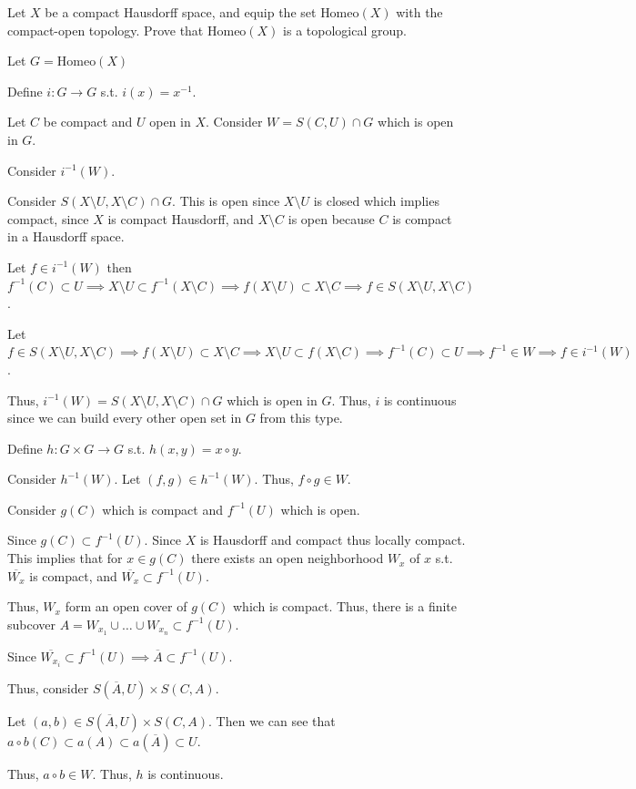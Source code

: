 \documentclass[12pt, letterpaper]{article}
\renewcommand{\t}[1]{\text{#1}}
\begin{document}
\begin{problem}{}
    Let $X$ be a compact Hausdorff space, and equip the set $\t{Homeo}(X)$
  with the compact-open topology. Prove that $\t{Homeo}(X)$ is a
  topological group.
\end{problem}
\begin{problemproof}
    Let $G=\t{Homeo}(X)$
    
    Define $i : G \to G$ s.t. $i(x)=x^{-1}$.

    Let $C$ be compact and $U$ open in $X$. Consider $W=S(C,U) \cap G$ which is open in $G$.

    Consider $i^{-1}(W)$. 

    Consider $S(X \setminus U, X \setminus C) \cap G$. This is open since $X \setminus U$ is closed which implies compact, since $X$ is compact Hausdorff, and $X \setminus C$ is open because $C$ is compact in a Hausdorff space.

    Let $f \in i^{-1}(W)$ then $f^{-1}(C) \subset U \implies X \setminus U \subset f^{-1}(X \setminus C) \implies f(X \setminus U) \subset X \setminus C \implies f \in S(X \setminus U, X \setminus C)$.

    Let $f \in S(X \setminus U, X \setminus C) \implies f(X \setminus U) \subset X \setminus C \implies X \setminus U \subset f(X \setminus C) \implies f^{-1}(C) \subset U \implies f^{-1} \in W \implies f \in i^{-1}(W)$.

    Thus, $i^{-1}(W)=S(X \setminus U, X \setminus C) \cap G$ which is open in $G$. Thus, $i$ is continuous since we can build every other open set in $G$ from this type.

    Define $h : G \times G \to G$ s.t. $h(x,y)=x \circ y$.

    Consider $h^{-1}(W)$. Let $(f,g) \in h^{-1}(W)$. Thus, $f \circ g \in W$.

    Consider $g(C)$ which is compact and $f^{-1}(U)$ which is open.

    Since $g(C) \subset f^{-1}(U)$. Since $X$ is Hausdorff and compact thus locally compact. This implies that for $x \in g(C)$ there exists an open neighborhood $W_x$ of $x$ s.t. $\overline{W_x}$ is compact, and $\overline{W_x} \subset f^{-1}(U)$.

    Thus, $W_x$ form an open cover of $g(C)$ which is compact. Thus, there is a finite subcover $A=W_{x_1} \cup \dots \cup W_{x_n} \subset f^{-1}(U)$.

    Since $\overline{W_{x_i}} \subset f^{-1}(U) \implies \overline{A} \subset f^{-1}(U)$.

    Thus, consider $S(\overline{A},U) \times S(C, A)$.

    Let $(a,b) \in S(\overline{A},U) \times S(C, A)$. Then we can see that $a \circ b(C) \subset a(A) \subset a(\overline{A}) \subset U$.

    Thus, $a\circ b \in W$. Thus, $h$ is continuous.
\end{problemproof}
\end{document}
